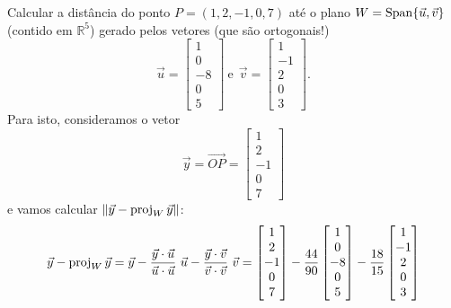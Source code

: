 \begin{ex}
Calcular a distância do ponto $P = (1,2,-1,0,7)$ até o plano $W = \operatorname{Span}\{\vec{u}, \vec{v}\}$ (contido em $\mathbb{R}^5$) gerado pelos vetores (que são ortogonais!)
\begin{equation}
\vec{u} =
\begin{bmatrix}
1 \\ 0 \\ -8 \\ 0 \\ 5
\end{bmatrix} \ \text{e} \ \
\vec{v} = \begin{bmatrix}
1 \\ -1 \\ 2 \\ 0 \\ 3
\end{bmatrix}.
\end{equation} Para isto, consideramos o vetor
\begin{equation}
\vec{y} = \vec{OP} = \begin{bmatrix}
1 \\ 2 \\ -1 \\ 0 \\ 7
\end{bmatrix}
\end{equation}e vamos calcular $\|\vec{y} - \operatorname{proj}_W \vec{y}\|$:
  \begin{align*}
\vec{y} - \proj_W \vec{y} & = \vec{y} - \frac{\vec{y} \cdot \vec{u}}{\vec{u} \cdot \vec{u}} \ \vec{u} - \frac{\vec{y} \cdot \vec{v}}{\vec{v} \cdot \vec{v}} \ \vec{v}  =
\begin{bmatrix}
1 \\ 2 \\ -1 \\ 0 \\ 7
\end{bmatrix} - \frac{44}{90}
\begin{bmatrix}
1 \\ 0 \\ -8 \\ 0 \\ 5
\end{bmatrix} - \frac{18}{15}
\begin{bmatrix}
1 \\ -1 \\ 2 \\ 0 \\ 3
\end{bmatrix} \\

\end{align*}
\end{ex}
